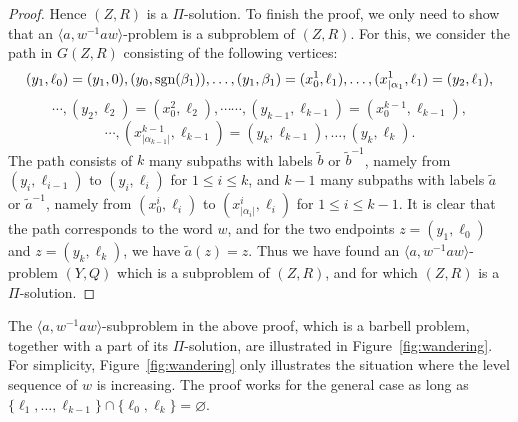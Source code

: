 \documentclass[10pt,a4paper]{amsart}
\theoremstyle{definition}
\theoremstyle{definition}
\numberwithin{equation}{section}
\begin{document}
\begin{proof}
Hence $(Z,R)$ is a $\Pi$-solution. To finish the proof, we only need to show that an $\langle a, w^{-1}aw\rangle$-problem is a subproblem of $(Z,R)$. For this, we consider the path in $G(Z,R)$ consisting of the following vertices:
$$ (y_1, \ell_0)=(y_1, 0), (y_0, \mbox{\rm sgn}(\beta_1)), \dots, (y_1, \beta_1)=(x^1_0, \ell_1), \dots, (x^1_{|\alpha_1}, \ell_1)=(y_2, \ell_1), $$
$$ \cdots, (y_2, \ell_2)=(x^2_0, \ell_2),  \cdots\cdots, (y_{k-1}, \ell_{k-1})=(x^{k-1}_0, \ell_{k-1}), $$
$$ \cdots, (x^{k-1}_{|\alpha_{k-1}|}, \ell_{k-1})=(y_k, \ell_{k-1}), \dots, (y_k, \ell_k). $$
The path consists of $k$ many subpaths with labels $\tilde{b}$ or $\tilde{b}^{-1}$, namely from $(y_i, \ell_{i-1})$ to $(y_i, \ell_i)$ for $1\leq i\leq k$, and $k-1$ many subpaths with labels $\tilde{a}$ or $\tilde{a}^{-1}$, namely from $(x^i_0, \ell_i)$ to $(x^i_{|\alpha_i|}, \ell_i)$ for $1\leq i\leq k-1$. It is clear that the path corresponds to the word $w$, and for the two endpoints $z=(y_1, \ell_0)$ and $z=(y_k, \ell_k)$, we have $\tilde{a}(z)=z$. Thus we have found an $\langle a, w^{-1}aw\rangle$-problem $(Y,Q)$ which is a subproblem of $(Z,R)$, and for which $(Z,R)$ is a $\Pi$-solution.
\end{proof}

The $\langle a, w^{-1}aw\rangle$-subproblem in the above proof, which is a barbell problem,  together with a part of its $\Pi$-solution, are illustrated in Figure~\ref{fig:wandering}. For simplicity, Figure~\ref{fig:wandering} only illustrates the situation where the level sequence of $w$ is increasing. The proof works for the general case as long as $\{\ell_1,\dots, \ell_{k-1}\}\cap \{\ell_0, \ell_k\}=\varnothing$.
\end{document}
